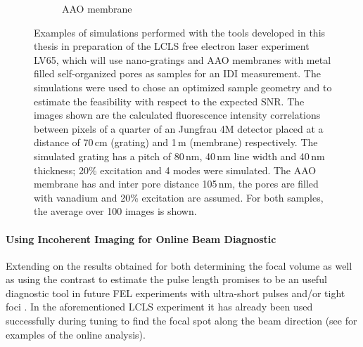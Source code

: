 \begin{figure}[p]
\begin{subfigure}[b]{0.37\textwidth}
		\caption{AAO membrane  }
		\label{fig:outlook_aao}
	\end{subfigure}
	\caption[Simulations in preparation of LV65 Experiment]{Examples of simulations performed with the tools developed in this thesis in preparation of the LCLS free electron laser experiment LV65, which will use nano-gratings and AAO membranes with metal filled self-organized pores as samples for an IDI measurement. The simulations were used to chose an optimized sample geometry and to estimate the feasibility with respect to the expected SNR. The images shown are the calculated fluorescence intensity correlations between pixels of a quarter of an Jungfrau 4M detector placed at a distance of 70\,cm (grating) and 1\,m (membrane) respectively. The simulated grating has a pitch of 80\,nm, 40\,nm line width and 40\,nm thickness; 20\% excitation and 4 modes were simulated. The AAO membrane has and inter pore distance 105\,nm, the pores are filled with vanadium and 20\% excitation are assumed. For both samples, the average over 100 images is shown.}
\end{figure}


\paragraph{Using Incoherent Imaging for Online Beam Diagnostic}
Extending on the results obtained for both determining the focal volume as well as using the contrast to estimate the pulse length promises to be an useful diagnostic tool in future FEL experiments with ultra-short pulses and/or tight foci \cite{nakumura2020,inoue2019}. In the aforementioned LCLS experiment it has already been used successfully during tuning to find the focal spot along the beam direction (see  for examples of the online analysis).


